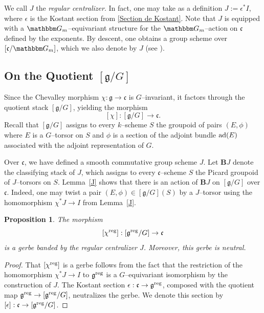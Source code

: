 \documentclass[12pt,english]{smfart}
\numberwithin{equation}{subsection}
\newtheorem{proposition}[equation]{Proposition}
\theoremstyle{remark}
\newcommand\GG{{\mathbbm G}}
\newcommand\ad{{\rm ad}}
\newcommand\reg{{\rm reg}}
\begin{document}
We call $J$ the \emph{regular centralizer}. In fact, one may take as a definition $J:=\epsilon^*I$, where $\epsilon$ is the Kostant section from \ref{Section de Kostant}. Note that $J$ is equipped with a $\GG_m$--equivariant structure for the $\GG_m$--action on $\mathfrak{c}$ defined by the exponents. By descent, one obtains a group scheme over $[\mathfrak{c}/\GG_m]$, which we also denote by $J$ (see \cite[3.3]{N}).

\subsection{On the Quotient $[\mathfrak{g}/G]$}

Since the Chevalley morphism $\chi:\mathfrak{g}\to\mathfrak{c}$ is $G$--invariant, it factors through the quotient stack $[\mathfrak{g}/G]$, yielding the morphism
$$
[\chi]:[\mathfrak{g}/G]\to \mathfrak{c}.
$$
Recall that $[\mathfrak{g}/G]$ assigns to every $k$--scheme $S$ the groupoid of pairs $(E,\phi)$ where $E$ is a $G$--torsor on $S$ and $\phi$ is a section of the adjoint bundle $\ad(E)$ associated with the adjoint representation of $G$.

Over $\mathfrak{c}$, we have defined a smooth commutative group scheme $J$. Let $\mathbf{B}J$ denote the classifying stack of $J$, which assigns to every $\mathfrak{c}$--scheme $S$ the Picard groupoid of $J$--torsors on $S$. Lemma~\ref{J} shows that there is an action of $\mathbf{B}J$ on $[\mathfrak{g}/G]$ over $\mathfrak{c}$. Indeed, one may twist a pair $(E,\phi)\in [\mathfrak{g}/G](S)$ by a $J$--torsor using the homomorphism $\chi^*J\to I$ from Lemma~\ref{J}.

\begin{proposition}\label{gerbe}
The morphism
$$
[\chi^\reg]:[\mathfrak{g}^\reg/G]\to \mathfrak{c}
$$
is a gerbe banded by the regular centralizer $J$. Moreover, this gerbe is neutral.
\end{proposition}

\begin{proof}
That $[\chi^\reg]$ is a gerbe follows from the fact that the restriction of the homomorphism $\chi^*J\to I$ to $\mathfrak{g}^\reg$ is a $G$--equivariant isomorphism by the construction of $J$. The Kostant section $\epsilon:\mathfrak{c}\to\mathfrak{g}^\reg$, composed with the quotient map $\mathfrak{g}^\reg\to [\mathfrak{g}^\reg/G]$, neutralizes the gerbe. We denote this section by $[\epsilon]:\mathfrak{c}\to [\mathfrak{g}^\reg/G]$.
\end{proof}
\end{document}

